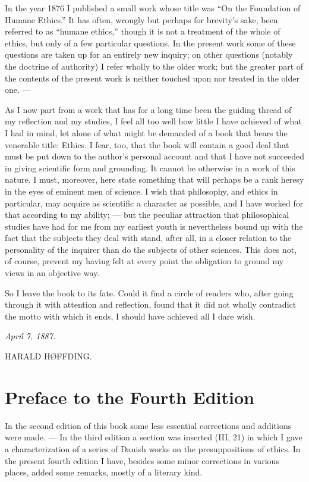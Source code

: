 \documentclass[12pt,a4paper,openany]{book}
\begin{document}
In the year 1876 I published a small work whose title was ``On the Foundation of Humane Ethics.''
It has often, wrongly but perhaps for brevity's sake, been referred to as ``humane ethics,'' though
it is not a treatment of the whole of ethics, but only of a few particular questions. In the present
work some of these questions are taken up for an entirely new inquiry; on other questions (notably
the doctrine of authority) I refer wholly to the older work; but the greater part of the contents of
the present work is neither touched upon nor treated in the older one. ---

As I now part from a work that has for a long time been the guiding thread of my reflection and my
studies, I feel all too well how little I have achieved of what I had in mind, let alone of what
might be demanded of a book that bears the venerable title: Ethics. I fear, too, that the book will
contain a good deal that must be put down to the author's personal account and that I have not
succeeded in giving scientific form and grounding. It cannot be otherwise in a work of this nature.
I must, moreover, here state something that will perhaps be a rank heresy in the eyes of eminent
men of science. I wish that philosophy, and ethics in particular, may acquire as scientific a
character as possible, and I have worked for that according to my ability; --- but the peculiar
attraction that philosophical studies have had for me from my earliest youth is nevertheless bound
up with the fact that the subjects they deal with stand, after all, in a closer relation to the
personality of the inquirer than do the subjects of other sciences. This does not, of course,
prevent my having felt at every point the obligation to ground my views in an objective way.

So I leave the book to its fate. Could it find a circle of readers who, after going through it with
attention and reflection, found that it did not wholly contradict the motto with which it ends, I
should have achieved all I dare wish.

\medskip
\noindent\hspace*{2em}\textit{April 7, 1887.}

\begin{flushright}HARALD HØFFDING.\hspace*{2em}\end{flushright}
\clearpage

\chapter*{Preface to the Fourth Edition}
In the second edition of this book some less essential corrections and additions were made. --- In
the third edition a section was inserted (III, 21) in which I gave a characterization of a series of
Danish works on the presuppositions of ethics. In the present fourth edition I have, besides some
minor corrections in various places, added some remarks, mostly of a literary kind.
\end{document}
